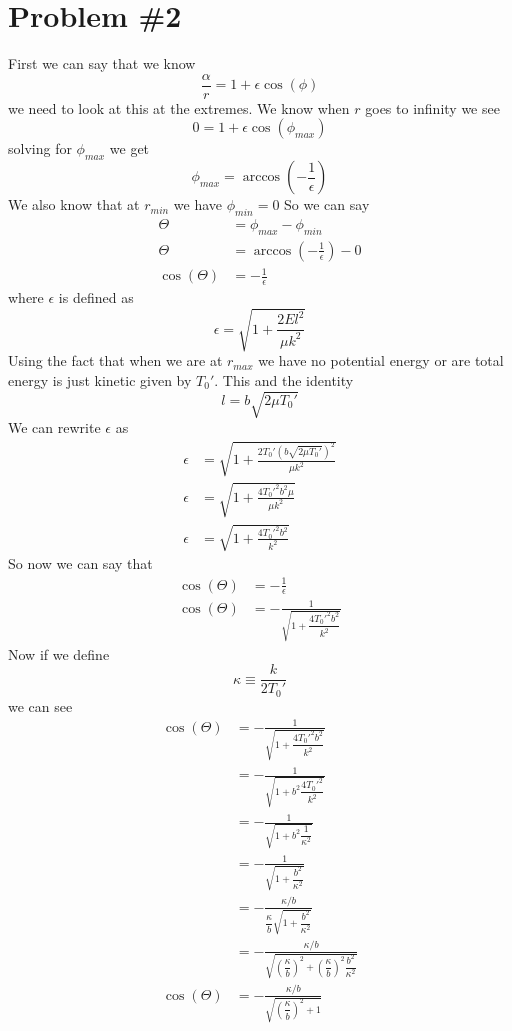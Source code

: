 \documentclass[11pt]{article}
\numberwithin{equation}{section}
\begin{document}
\section{Problem \#2}
First we can say that we know 
$$\frac{\alpha}{r} = 1+\epsilon\cos(\phi)$$
we need to look at this at the extremes. We know when $r$ goes to infinity we see
$$0= 1+\epsilon\cos(\phi_{max})$$
solving for $\phi_{max}$ we get
$$\phi_{max} = \arccos\left(-\frac{1}{\epsilon}\right)$$
We also know that at $r_{min}$ we have $\phi_{min} =0$
So we can say
\begin{align*}
\Theta &= \phi_{max} - \phi_{min}\\
\Theta &= \arccos\left(-\frac{1}{\epsilon}\right)-0\\
\cos(\Theta) &= -\frac{1}{\epsilon}
\end{align*}
where $\epsilon$ is defined as
$$\epsilon = \sqrt{1+\frac{2El^2}{\mu k^2}}$$
Using the fact that when we are at $r_{max}$ we have no potential energy or are total energy is just kinetic given by $T_0'$. This and the identity
$$l= b\sqrt{2\mu T_0'}$$
We can rewrite $\epsilon$ as
\begin{align*}
\epsilon &= \sqrt{1+\frac{2T_0'(b\sqrt{2\mu T_0'})^2}{\mu k^2}}\\
\epsilon &= \sqrt{1+\frac{4T_0'^2b^2\mu}{\mu k^2}}\\
\epsilon &= \sqrt{1+\frac{4T_0'^2b^2}{k^2}}
\end{align*}
So now we can say that
\begin{align*}
\cos(\Theta) &= -\frac{1}{\epsilon}\\
\cos(\Theta) &= -\frac{1}{\sqrt{1+\dfrac{4T_0'^2b^2}{k^2}}}
\end{align*}
Now if we define 
$$\kappa\equiv \frac{k}{2T_0'}$$
we can see
\begin{align*}
\cos(\Theta) &= -\frac{1}{\sqrt{1+\dfrac{4T_0'^2b^2}{k^2}}}\\
&= -\frac{1}{\sqrt{1+b^2\dfrac{4T_0'^2}{k^2}}}\\
&= -\frac{1}{\sqrt{1+b^2\dfrac{1}{\kappa^2}}}\\
&= -\frac{1}{\sqrt{1+\dfrac{b^2}{\kappa^2}}}\\
&= -\frac{\kappa/b}{\dfrac{\kappa}{b}\sqrt{1+\dfrac{b^2}{\kappa^2}}}\\
&= -\frac{\kappa/b}{\sqrt{\left(\dfrac{\kappa}{b}\right)^2+\left(\dfrac{\kappa}{b}\right)^2\dfrac{b^2}{\kappa^2}}}\\
\cos(\Theta) &= -\frac{\kappa/b}{\sqrt{\left(\dfrac{\kappa}{b}\right)^2+1}}
\end{align*}
\end{document}
